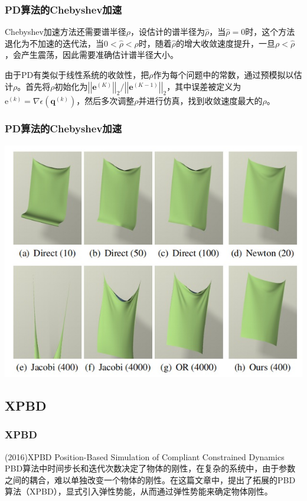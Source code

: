 \documentclass[aspectratio=43]{ctexbeamer}
\begin{document}
\begin{frame}
  \frametitle{PD算法的Chebyshev加速}
		\; \;Chebyshev加速方法还需要谱半径$\rho$，设估计的谱半径为$\hat \rho$，当$\hat \rho = 0$时，这个方法退化为不加速的迭代法，当$0 < \hat \rho < \rho$时，随着$\hat \rho$的增大收敛速度提升，一旦$\rho < \hat \rho$，会产生震荡，因此需要准确估计谱半径大小。

		\; \;由于PD有类似于线性系统的收敛性，把$\rho$作为每个问题中的常数，通过预模拟以估计$\rho$。首先将$\rho$初始化为$\left|\left|\mathbf{e}^{(K)}\right|\right|_{2}/\left|\left|\mathbf{e}^{(K-1)}\right|\right|_{2}$，其中误差被定义为$\mathrm{e}^{(k)}=\nabla\epsilon(\mathbf{q}^{(k)})$，然后多次调整$\rho$并进行仿真，找到收敛速度最大的$\rho$。

\end{frame}

\begin{frame}
  \frametitle{PD算法的Chebyshev加速}
        \begin{center}
            \includegraphics[width=0.8\linewidth]{./fig/Chebyshev加速对比.jpg}
        \end{center}
\end{frame}

\subsection{XPBD}
\begin{frame}
  \frametitle{XPBD}
	(2016)XPBD Position-Based Simulation of Compliant Constrained Dynamics\\[10pt]

		\; \;PBD算法中时间步长和迭代次数决定了物体的刚性，在复杂的系统中，由于参数之间的耦合，难以单独改变一个物体的刚性。在这篇文章中，提出了拓展的PBD算法（XPBD），显式引入弹性势能，从而通过弹性势能来确定物体刚性。
\end{frame}
\end{document}
